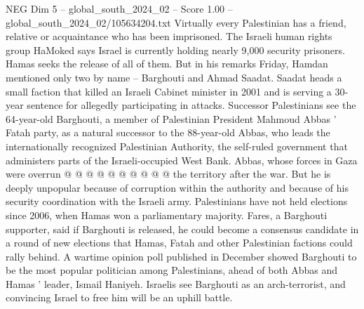 \begin{textsample}{NEG Dim 5 – global\_south\_2024\_02 – Score 1.00 – global\_south\_2024\_02/105634204.txt}
Virtually every Palestinian has a friend, relative or acquaintance who has been imprisoned.
The Israeli human rights group HaMoked says Israel is currently holding nearly 9,000 security prisoners.
Hamas seeks the release of all of them.
But in his remarks Friday, Hamdan mentioned only two by name -- Barghouti and Ahmad Saadat.
Saadat heads a small faction that killed an Israeli Cabinet minister in 2001 and is serving a 30-year sentence for allegedly participating in attacks.
Successor Palestinians see the 64-year-old Barghouti, a member of Palestinian President Mahmoud Abbas ' Fatah party, as a natural successor to the 88-year-old Abbas, who leads the internationally recognized Palestinian Authority, the self-ruled government that administers parts of the Israeli-occupied West Bank.
Abbas, whose forces in Gaza were overrun @ @ @ @ @ @ @ @ @ @ the territory after the war.
But he is deeply unpopular because of corruption within the authority and because of his security coordination with the Israeli army.
Palestinians have not held elections since 2006, when Hamas won a parliamentary majority.
Fares, a Barghouti supporter, said if Barghouti is released, he could become a consensus candidate in a round of new elections that Hamas, Fatah and other Palestinian factions could rally behind.
A wartime opinion poll published in December showed Barghouti to be the most popular politician among Palestinians, ahead of both Abbas and Hamas ' leader, Ismail Haniyeh.
Israelis see Barghouti as an arch-terrorist, and convincing Israel to free him will be an uphill battle.

\end{textsample}
